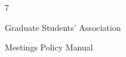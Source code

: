   

  

  

  

  

  



                                                                     7  

                                               

                                           Graduate Students’ Association  

                                                Meetings Policy Manual  

  

